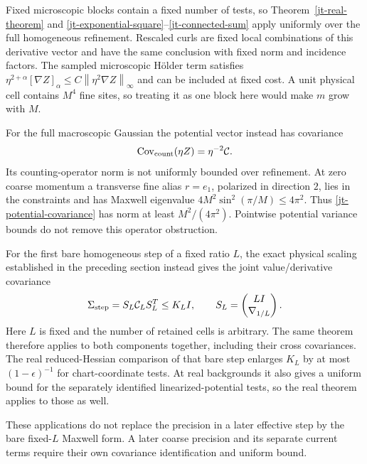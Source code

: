 \documentclass[11pt]{article}
\theoremstyle{remark}\newtheorem{remark}[theorem]{Remark}
\newcommand{\norm}[1]{\left\lVert#1\right\rVert}
\begin{document}
Fixed microscopic blocks contain a fixed number of tests, so
Theorem~\ref{jt-real-theorem} and
\eqref{jt-exponential-square}--\eqref{jt-connected-sum} apply
uniformly over the full homogeneous refinement. Rescaled curls
are fixed local combinations of this derivative vector and
have the same conclusion with fixed norm and incidence factors.
The sampled microscopic H\"older term satisfies
$\eta^{2+\alpha}[\nabla Z]_\alpha
\le C\norm{\eta^2\nabla Z}_\infty$ and can be included at
fixed cost. A unit physical cell contains $M^4$ fine sites,
so treating it as one block here would make $m$ grow with $M$.

For the full macroscopic Gaussian the potential vector instead
has covariance
\begin{equation}\label{jt-potential-covariance}
 \operatorname{Cov}_{\rm count}(\eta Z)=\eta^{-2}\mathcal C.
\end{equation}
Its counting-operator norm is not uniformly bounded over
refinement. At zero coarse momentum a transverse fine alias
$r=e_1$, polarized in direction $2$, lies in the constraints
and has Maxwell eigenvalue $4M^2\sin^2(\pi/M)\le4\pi^2$.
Thus \eqref{jt-potential-covariance} has norm at least
$M^2/(4\pi^2)$. Pointwise potential variance bounds do not
remove this operator obstruction.

For the first bare homogeneous step of a fixed ratio $L$, the
exact physical scaling established in the preceding section
instead gives the joint value/derivative covariance
\begin{equation}\label{jt-fixed-step-covariance}
 \Sigma_{\rm step}=S_L\mathcal C_LS_L^T\le K_LI,
 \qquad S_L=\begin{pmatrix}LI\\\nabla_{1/L}\end{pmatrix}.
\end{equation}
Here $L$ is fixed and the number of retained cells is arbitrary.
The same theorem therefore applies to both components together,
including their cross covariances. The real reduced-Hessian
comparison of that bare step enlarges $K_L$ by at most
$(1-\epsilon)^{-1}$ for chart-coordinate tests. At real
backgrounds it also gives a uniform bound for the separately
identified linearized-potential tests, so the real theorem
applies to those as well.

These applications do not replace the precision in a later
effective step by the bare fixed-$L$ Maxwell form. A later
coarse precision and its separate current terms require their
own covariance identification and uniform bound.
\end{document}
